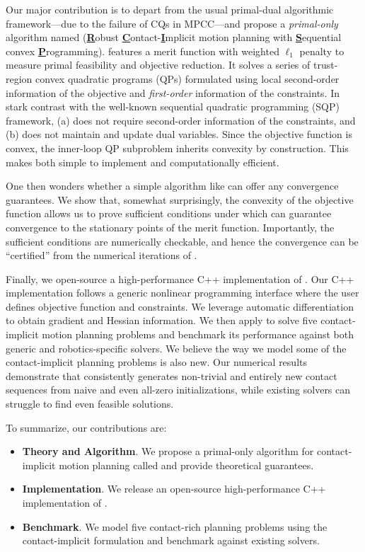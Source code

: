 Our major contribution is to depart from the usual primal-dual algorithmic framework---due to the failure of CQs in MPCC---and propose a \emph{primal-only} algorithm named \crisp (\textbf{\underline{R}}obust \textbf{\underline{C}}ontact-\textbf{\underline{I}}mplicit motion planning with \textbf{\underline{S}}equential convex \textbf{\underline{P}}rogramming). \crisp features a merit function with weighted $\ell_1$ penalty to measure primal feasibility and objective reduction. It solves a series of trust-region convex quadratic programs (QPs) formulated using local second-order information of the objective and \emph{first-order} information of the constraints. In stark contrast with the well-known sequential quadratic programming (SQP) framework, \crisp (a) does not require second-order information of the constraints, and (b) does not maintain and update dual variables. Since the objective function is convex, the inner-loop QP subproblem inherits convexity by construction. This makes \crisp both simple to implement and computationally efficient. 

One then wonders whether a simple algorithm like \crisp can offer any convergence guarantees. We show that, somewhat surprisingly, the convexity of the objective function allows us to prove sufficient conditions under which \crisp can guarantee convergence to the stationary points of the merit function. Importantly, the sufficient conditions are numerically checkable, and hence the convergence can be ``certified'' from the numerical iterations of \crisp.

Finally, we open-source a high-performance C++ implementation of \crisp. Our C++ implementation follows a generic nonlinear programming interface where the user defines objective function and constraints. We leverage automatic differentiation to obtain gradient and Hessian information. We then apply \crisp to solve five contact-implicit motion planning problems and benchmark its performance against both generic and robotics-specific solvers. We believe the way we model some of the contact-implicit planning problems is also new. Our numerical results demonstrate that \crisp consistently generates non-trivial and entirely new contact sequences from naive and even all-zero initializations, while existing solvers can struggle to find even feasible solutions. 

To summarize, our contributions are:
\begin{itemize}
    \item \textbf{Theory and Algorithm}. We propose a primal-only algorithm for contact-implicit motion planning called \crisp and provide theoretical guarantees.
    \item \textbf{Implementation}. We release an open-source high-performance C++ implementation of \crisp.
    \item \textbf{Benchmark}. We model five contact-rich planning problems using the contact-implicit formulation and benchmark \crisp against existing solvers.
\end{itemize}

